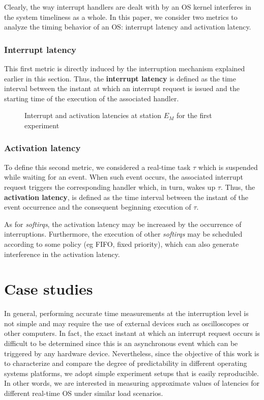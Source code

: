 \documentclass{acm_proc_article-sp}
\begin{document}
Clearly, the way interrupt handlers are dealt with by an OS kernel interferes in the
system timeliness as a whole.  In this paper, we consider two metrics to analyze the
timing behavior of an OS: interrupt latency and activation latency.

\subsubsection*{Interrupt latency}
\label{sec:latIRQ}

This first metric is directly induced by the interruption mechanism explained
earlier in this section. Thus, the \textbf{interrupt latency} is defined as the
time interval between the instant at which an interrupt request is issued and the
starting time of the execution of the associated handler.

\begin{figure*}[t!]
  \centering {\scalebox{1}{}}
  \caption{Interrupt and activation latencies at station $E_M$ for the
    first experiment}
  \label{fig:dispExp}
\end{figure*}

\subsubsection*{Activation latency}

To define this second metric, we considered a real-time task $\tau$ which is
suspended while waiting for an event. When such event occurs, the associated
interrupt request triggers the corresponding handler which, in turn, wakes up
$\tau$.  Thus, the \textbf{activation latency}, is defined as the time interval
between the instant of the event occurrence and the consequent beginning execution 
of $\tau$.

As for \emph{softirqs}, the activation latency may be increased by the occurrence of
interruptions. Furthermore, the execution of other \emph{softirqs} may be scheduled
according to some policy (eg FIFO, fixed priority), which can also generate
interference in the activation latency. 


\section{Case studies}
\label{sec:metod}

In general, performing accurate time measurements at the interruption level is
not simple and may require the use of external devices such as oscilloscopes or
other computers. In fact, the exact instant at which an interrupt request occurs is
difficult to be determined since this is an asynchronous event which can be
triggered by any hardware device. Nevertheless, since the objective of this work is
to characterize and compare the degree of predictability in different operating
systems platforms, we adopt simple experiment setups that is easily reproducible.
In other words, we are interested in measuring approximate values of latencies for
different real-time OS under similar load scenarios.
 
\end{document}
